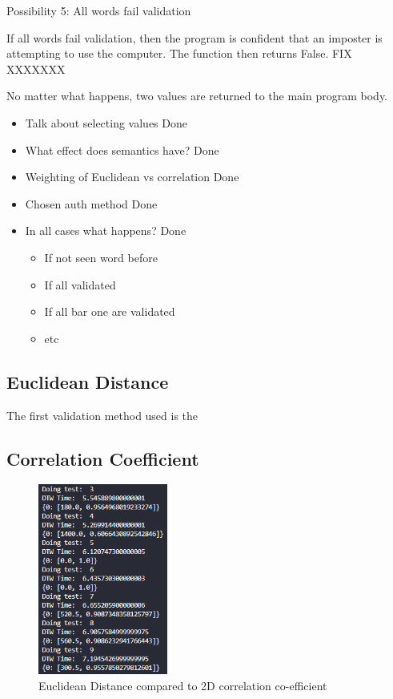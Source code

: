 \documentclass[10pt,a4paper]{report}
\begin{document}
Possibility 5: All words fail validation

If all words fail validation, then the program is confident that an imposter is attempting to use the computer. The function then returns False. FIX XXXXXXX

No matter what happens, two values are returned to the main program body.

\begin{itemize}
	\item Talk about selecting values Done
	\item What effect does semantics have? Done
	\item Weighting of Euclidean vs correlation Done
	\item Chosen auth method Done
	\item In all cases what happens? Done
	\begin{itemize}
		\item If not seen word before
		\item If all validated
		\item If all bar one are validated
		\item etc
	\end{itemize}
\end{itemize}

\subsection{Euclidean Distance}

The first validation method used is the

\subsection{Correlation Coefficient}

\begin{figure}
	\begin{center}
		\includegraphics[width=0.38\textwidth]{EucVs2D}
	\end{center}
	\caption{Euclidean Distance compared to 2D correlation co-efficient}
	\label{fig:VCompare}
\end{figure}
\end{document}
